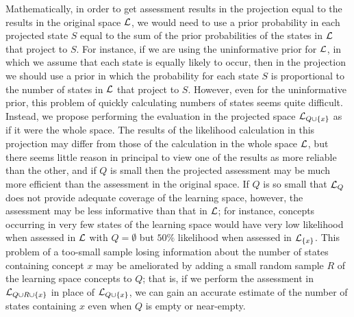 \documentclass[11pt]{llncs}
\begin{document}
{Mathematically, in order to get assessment results in the projection equal to the results in the original space $\cal L$, we would need to use a prior probability in each projected state $S$ equal to the sum of the prior probabilities of the states in $\cal L$ that project to $S$. For instance, if we are using the uninformative prior for $\cal L$, in which we assume that each state is equally likely to occur, then in the projection we should use a prior in which the probability for each state $S$ is proportional to the number of states in $\cal L$ that project to $S$. However, even for the uninformative prior, this problem of quickly calculating numbers of states seems quite difficult. Instead, we propose performing the evaluation in the projected space  ${\cal L}_{Q\cup\{x\}}$ as if it were the whole space. The results of the likelihood calculation in this projection may differ from those of the calculation in the whole space $\cal L$, but there seems little reason in principal to view one of the results as more reliable than the other, and if $Q$ is small then the projected assessment may be much more efficient than the assessment in the original space. If $Q$ is so small that ${\cal L}_Q$ does not provide adequate coverage of the learning space, however,
the assessment may be less informative than that in $\cal L$; for instance, concepts occurring in very few states of the learning space would have very low likelihood when assessed in $\cal L$ with $Q=\emptyset$ but $50\%$ likelihood when assessed in ${\cal L}_{\{x\}}$. This problem of a too-small sample losing information about the number of states containing concept $x$ may be ameliorated by adding a small random sample $R$ of the learning space concepts to $Q$; that is, if we perform the assessment in ${\cal L}_{Q\cup R\cup\{x\}}$ in place of ${\cal L}_{Q\cup\{x\}}$, we can gain an accurate estimate of the number of states containing $x$ even when $Q$ is empty or near-empty.

}
\end{document}
